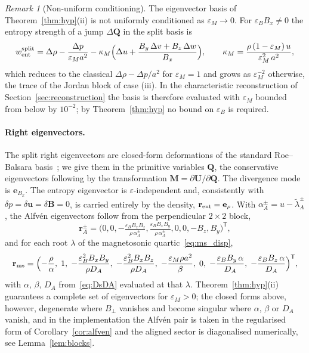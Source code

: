 \documentclass[a4paper,fleqn]{cas-sc}
\theoremstyle{remark}
\newtheorem{remark}[theorem]{Remark}
\begin{document}
\begin{remark}[Non-uniform conditioning]\label{rem:nonuniform}
The eigenvector basis of Theorem~\ref{thm:hyp}(ii) is not uniformly
conditioned as $\varepsilon_M\to0$. For $\varepsilon_BB_x\neq0$ the entropy
strength of a jump $\Delta\mathbf Q$ in the split basis is
\begin{equation}\label{eq:went_split}
w_{\rm ent}^{\rm split}
=\Delta\rho-\frac{\Delta p}{\varepsilon_Ma^2}
-\kappa_M\Bigl(\Delta u+\frac{B_y\,\Delta v+B_z\,\Delta w}{B_x}\Bigr),
\qquad
\kappa_M=\frac{\rho\,(1-\varepsilon_M)\,u}{\varepsilon_M^2\,a^2},
\end{equation}
which reduces to the classical $\Delta\rho-\Delta p/a^2$ for
$\varepsilon_M=1$ and grows as $\varepsilon_M^{-2}$ otherwise, the trace of
the Jordan block of case (iii). In the characteristic reconstruction of Section~\ref{sec:reconstruction} the basis is therefore evaluated with $\varepsilon_M$ bounded from below by $10^{-2}$; by Theorem~\ref{thm:hyp} no bound on $\varepsilon_B$ is required.

\end{remark}

\paragraph{Right eigenvectors.}
The split right eigenvectors are closed-form deformations of the standard
Roe--Balsara basis~\cite{RoeBalsara1996}; we give them in the primitive
variables $\mathbf Q$, the conservative eigenvectors following by the
transformation $\mathbf M=\partial\mathbf U/\partial\mathbf Q$. The divergence
mode is $\mathbf e_{B_x}$. The entropy eigenvector is $\varepsilon$-independent
and, consistently with $\delta p=\delta\mathbf u=\delta\mathbf B=0$, is carried
entirely by the density, $\mathbf r_{\rm ent}=\mathbf e_\rho$. With
$\alpha_A^{\pm}=u-\tilde\lambda_A^{\pm}$, the Alfv\'en eigenvectors follow from
the perpendicular $2\times2$ block,
\begin{equation}\label{eq:R_alf}
\mathbf r_A^{\pm}=\Big(0,0,-\tfrac{\varepsilon_B B_xB_z}{\rho\,\alpha_A^{\pm}},
\tfrac{\varepsilon_B B_xB_y}{\rho\,\alpha_A^{\pm}},0,0,-B_z,B_y\Big)^{\mathsf T},
\end{equation}
and for each root $\lambda$ of the magnetosonic quartic~\eqref{eq:ms_disp},
\begin{equation}\label{eq:r_ms}
\mathbf r_{\rm ms}=\Bigl(-\frac{\rho}{\alpha},\;1,\;
-\frac{\varepsilon_B^2B_xB_y}{\rho D_A},\;
-\frac{\varepsilon_B^2B_xB_z}{\rho D_A},\;
-\frac{\varepsilon_M\rho a^2}{\beta},\;0,\;
-\frac{\varepsilon_BB_y\,\alpha}{D_A},\;
-\frac{\varepsilon_BB_z\,\alpha}{D_A}\Bigr)^{\mathsf T},
\end{equation}
with $\alpha$, $\beta$, $D_A$ from~\eqref{eq:DsDA} evaluated at that
$\lambda$. Theorem~\ref{thm:hyp}(ii) guarantees a complete set of
eigenvectors for $\varepsilon_M>0$;    the closed forms above, however, degenerate where $B_\perp$ vanishes and become singular where $\alpha$, $\beta$ or $D_A$ vanish, and in the
implementation the Alfv\'en pair is taken in the regularised form of
Corollary~\ref{cor:alfven} and the aligned sector is diagonalised
numerically, see Lemma~\ref{lem:blocks}.
\end{document}
